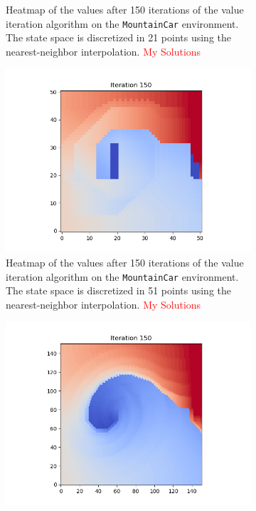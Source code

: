 \documentclass{article}
\begin{document}
\begin{enumerate}[(a)]
\begin{figure}[h!]
\begin{subfigure}{0.3\textwidth}
\caption{Heatmap of the values after 150 iterations of the value iteration algorithm on the \texttt{MountainCar} environment. 
                The state space is discretized in 21 points using the nearest-neighbor interpolation.  \textcolor{red}{My Solutions}}
    \end{subfigure}
    \hspace{0.1 in}
    \begin{subfigure}{0.3\textwidth}
        \centering
        \includegraphics[width=\textwidth]{figures/part_2_moutain-car_s-51.png}
\caption{Heatmap of the values after 150 iterations of the value iteration algorithm on the \texttt{MountainCar} environment. 
                The state space is discretized in 51 points using the nearest-neighbor interpolation.  \textcolor{red}{My Solutions}}
    \end{subfigure}
        \hspace{0.1 in}
    \begin{subfigure}{0.3\textwidth}
        \centering
        \includegraphics[width=\textwidth]{figures/part_2_moutain-car_s-151.png}

\end{subfigure}
\end{figure}
\end{enumerate}
\end{document}
